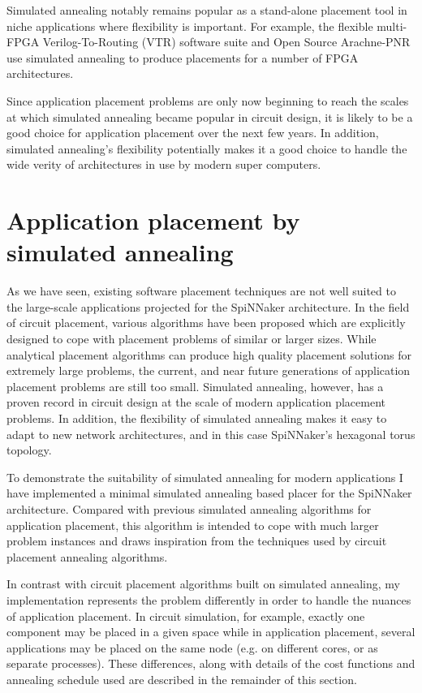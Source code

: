 				Simulated annealing notably remains popular as a stand-alone placement
				tool in niche applications where flexibility is important. For example,
				the flexible multi-FPGA Verilog-To-Routing (VTR) software suite
				\cite{luu14} and Open Source Arachne-PNR \cite{cseed} use simulated
				annealing to produce placements for a number of FPGA architectures.
				
				Since application placement problems are only now beginning to reach
				the scales at which simulated annealing became popular in circuit
				design, it is likely to be a good choice for application placement over
				the next few years. In addition, simulated annealing's flexibility
				potentially makes it a good choice to handle the wide verity of
				architectures in use by modern super computers.
	
	\section{Application placement by simulated annealing}
		
		\label{sec:placement-by-annealing}	
		
		As we have seen, existing software placement techniques are not well suited
		to the large-scale applications projected for the SpiNNaker architecture.
		In the field of circuit placement, various algorithms have been proposed
		which are explicitly designed to cope with placement problems of similar or
		larger sizes. While analytical placement algorithms can produce high
		quality placement solutions for extremely large problems, the current, and
		near future generations of application placement problems are still too
		small. Simulated annealing, however, has a proven record in circuit design
		at the scale of modern application placement problems. In addition, the
		flexibility of simulated annealing makes it easy to adapt to new network
		architectures, and in this case SpiNNaker's hexagonal torus topology.
		
		To demonstrate the suitability of simulated annealing for modern
		applications I have implemented a minimal simulated annealing based placer
		for the SpiNNaker architecture. Compared with previous simulated annealing
		algorithms for application placement, this algorithm is intended to cope
		with much larger problem instances and draws inspiration from the
		techniques used by circuit placement annealing algorithms.
		
		In contrast with circuit placement algorithms built on simulated annealing,
		my implementation represents the problem differently in order to handle the
		nuances of application placement. In circuit simulation, for example,
		exactly one component may be placed in a given space while in application
		placement, several applications may be placed on the same node (e.g. on
		different cores, or as separate processes). These differences, along with
		details of the cost functions and annealing schedule used are described in
		the remainder of this section.
		

